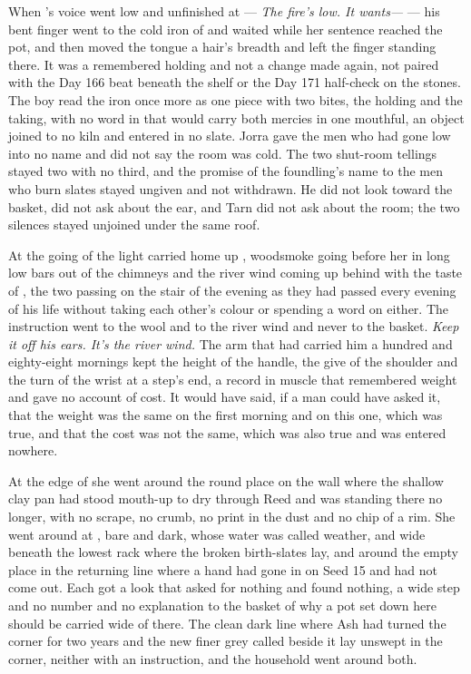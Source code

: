 When 's voice went low and unfinished at  --- \emph{The fire's low. It wants---} --- his bent finger went to the cold iron of  and waited while her sentence reached the pot, and then moved the tongue a hair's breadth and left the finger standing there. It was a remembered holding and not a change made again, not paired with the Day 166 beat beneath the shelf or the Day 171 half-check on the stones. The boy read the iron once more as one piece with two bites, the holding and the taking, with no word in  that would carry both mercies in one mouthful, an object joined to no kiln and entered in no slate. Jorra gave the men who had gone low into  no name and did not say the room was cold. The two shut-room tellings stayed two with no third, and the promise of the foundling's name to the men who burn slates stayed ungiven and not withdrawn. He did not look toward the basket, did not ask about the ear, and Tarn did not ask about the room; the two silences stayed unjoined under the same roof.

\scenebreak

At the going of the light  carried  home up , woodsmoke going before her in long low bars out of the chimneys and the river wind coming up behind with the taste of , the two passing on the stair of the evening as they had passed every evening of his life without taking each other's colour or spending a word on either. The instruction went to the wool and to the river wind and never to the basket. \emph{Keep it off his ears. It's the river wind.} The arm that had carried him a hundred and eighty-eight mornings kept the height of the handle, the give of the shoulder and the turn of the wrist at a step's end, a record in muscle that remembered weight and gave no account of cost. It would have said, if a man could have asked it, that the weight was the same on the first morning and on this one, which was true, and that the cost was not the same, which was also true and was entered nowhere.

At the edge of  she went around the round place on the wall where the shallow clay pan had stood mouth-up to dry through Reed and was standing there no longer, with no scrape, no crumb, no print in the dust and no chip of a rim. She went around  at , bare and dark, whose water was called weather, and wide beneath the lowest rack where the broken birth-slates lay, and around the empty place in the returning line where a hand had gone in on Seed 15 and had not come out. Each got a look that asked for nothing and found nothing, a wide step and no number and no explanation to the basket of why a pot set down here should be carried wide of there. The clean dark line where Ash had turned the corner for two years and the new finer grey called  beside it lay unswept in the corner, neither with an instruction, and the household went around both.

